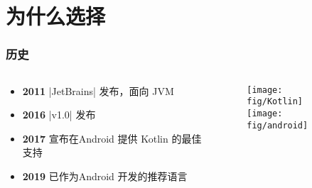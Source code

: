 \section{为什么选择 }%
\begin{frame}[fragile]
    \frametitle{历史}
    \begin{columns}
        \begin{column}{0.5\textwidth}
            \begin{itemize}
                \item \textbf{2011} |JetBrains| 发布，面向 JVM
                \item \textbf{2016} |v1.0| 发布
                \item \textbf{2017} \google{} 宣布在{\color{android}\faAndroid}Android 提供 Kotlin 的最佳支持
                \item \textbf{2019} 已作为{\color{android}\faAndroid}Android 开发的推荐语言
            \end{itemize}
        \end{column}
        \begin{column}{0.5\textwidth}
            \begin{figure}
            \begin{center}
                \texttt{[image: fig/Kotlin]}\\
                \vspace{12pt}
                \texttt{[image: fig/android]}
            \end{center}
            \end{figure}
        \end{column}
    \end{columns}
\end{frame}

